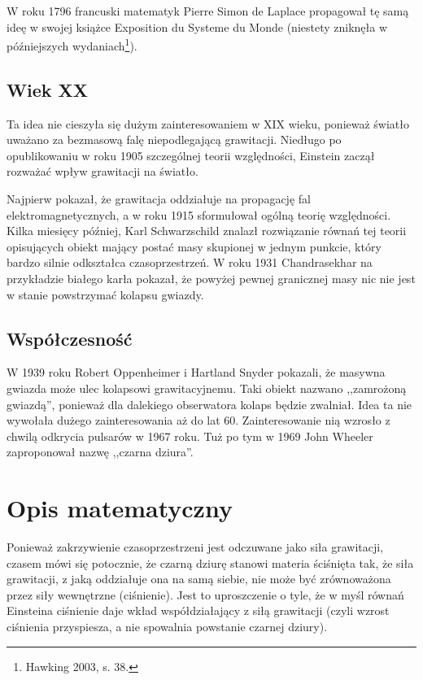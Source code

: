 \documentclass[12pt]{article}
\begin{document}
W roku 1796 francuski matematyk Pierre Simon de Laplace propagowa\l{} t\k{e} sam\k{a} ide\k{e} w swojej ksi\k{a}\.{z}ce Exposition du Systeme du Monde (niestety znikn\k{e}\l{}a w p\'{o}\'{z}niejszych wydaniach\footnote[4]{Hawking 2003, s. 38.}).
\subsection{Wiek XX}
Ta idea nie cieszy\l{}a si\k{e} du\.{z}ym zainteresowaniem w XIX wieku, poniewa\.{z} \'{s}wiat\l{}o uwa\.{z}ano za bezmasow\k{a} fal\k{e} niepodlegaj\k{a}c\k{a} grawitacji. Nied\l{}ugo po opublikowaniu w roku 1905 szczeg\'{o}lnej teorii wzgl\k{e}dno\'{s}ci, Einstein zacz\k{a}\l{} rozwa\.{z}a\'{c} wp\l{}yw grawitacji na \'{s}wiat\l{}o.

Najpierw pokaza\l{}, \.{z}e grawitacja oddzia\l{}uje na propagacj\k{e} fal \newline elektromagnetycznych, a w roku 1915 sformu\l{}owa\l{} og\'{o}ln\k{a} teori\k{e} wzgl\k{e}dno\'{s}ci. Kilka miesi\k{e}cy p\'{o}\'{z}niej, Karl Schwarzschild znalaz\l{} rozwi\k{a}zanie r\'{o}wna\'{n} tej teorii opisuj\k{a}cych obiekt maj\k{a}cy posta\'{c} masy skupionej w jednym punkcie, kt\'{o}ry bardzo silnie odkszta\l{}ca czasoprzestrze\'{n}. W roku 1931 Chandrasekhar na przyk\l{}adzie bia\l{}ego kar\l{}a pokaza\l{}, \.{z}e powy\.{z}ej pewnej granicznej masy nic nie jest w stanie powstrzyma\'{c} kolapsu gwiazdy.
\subsection{Wsp\'{o}\l{}czesno\'{s}\'{c}}
W 1939 roku Robert Oppenheimer i Hartland Snyder pokazali, \.{z}e masywna gwiazda mo\.{z}e ulec kolapsowi grawitacyjnemu. Taki obiekt nazwano ,,zamro\.{z}on\k{a} gwiazd\k{a}\textquotedblright{}, poniewa\.{z} dla dalekiego obserwatora kolaps b\k{e}dzie zwalnia\l{}. Idea ta nie wywo\l{}a\l{}a du\.{z}ego zainteresowania a\.{z} do lat 60. Zainteresowanie ni\k{a} wzros\l{}o z chwil\k{a} odkrycia pulsar\'{o}w w 1967 roku. Tu\.{z} po tym w 1969 John Wheeler zaproponowa\l{} nazw\k{e} ,,czarna dziura\textquotedblright{}.


\newpage
\section{Opis matematyczny}
Poniewa\.{z} zakrzywienie czasoprzestrzeni jest odczuwane jako si\l{}a grawitacji, czasem m\'{o}wi si\k{e} potocznie, \.{z}e czarn\k{a} dziur\k{e} stanowi materia \'{s}ci\'{s}ni\k{e}ta tak, \.{z}e si\l{}a grawitacji, z jak\k{a} oddzia\l{}uje ona na sam\k{a} siebie, nie mo\.{z}e by\'{c} zr\'{o}wnowa\.{z}ona przez si\l{}y wewn\k{e}trzne (ci\'{s}nienie). Jest to uproszczenie o tyle, \.{z}e w my\'{s}l r\'{o}wna\'{n} Einsteina ci\'{s}nienie daje wk\l{}ad wsp\'{o}\l{}dzia\l{}aj\k{a}cy z si\l{}\k{a} grawitacji (czyli wzrost ci\'{s}nienia przyspiesza, a nie spowalnia powstanie czarnej dziury).
\end{document}
